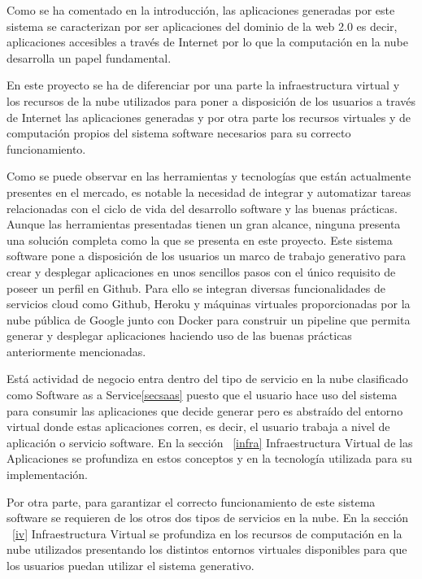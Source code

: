 \documentclass[a4paper,11pt]{book}
\begin{document}
Como se ha comentado en la introducción, las aplicaciones generadas por este sistema se caracterizan por ser aplicaciones del dominio de la web 2.0 es decir, aplicaciones accesibles a través de Internet por lo que la computación en la nube desarrolla un papel fundamental. 

En este proyecto se ha de diferenciar por una parte la infraestructura virtual y los recursos de la nube utilizados para poner a disposición de los usuarios  a través de Internet las aplicaciones generadas y por otra parte los recursos virtuales y de computación propios del sistema software necesarios para su correcto funcionamiento. 

Como se puede observar en las herramientas y tecnologías que están actualmente presentes en el mercado, es notable la necesidad de integrar y automatizar tareas relacionadas con el ciclo de vida del desarrollo software y las buenas prácticas. Aunque las herramientas presentadas tienen un gran alcance, ninguna presenta una solución completa como la que se presenta en este proyecto. Este sistema software pone a disposición de los usuarios un marco de trabajo generativo para crear y desplegar aplicaciones en unos sencillos pasos con el único requisito de poseer un perfil en Github. Para ello se integran diversas funcionalidades de servicios cloud como Github, Heroku y máquinas virtuales proporcionadas por la nube pública de Google  junto con Docker para construir un pipeline que permita generar y desplegar aplicaciones haciendo uso de las buenas prácticas anteriormente mencionadas.

Está actividad de negocio entra dentro del tipo de servicio en la nube clasificado como Software as a Service\ref{secsaas} puesto que el usuario hace uso del sistema para consumir las aplicaciones que decide generar pero es abstraído del entorno virtual donde estas aplicaciones corren, es decir, el usuario trabaja a nivel de aplicación o servicio software. En la sección ~\ref{infra}  Infraestructura Virtual de las Aplicaciones se profundiza en estos conceptos y en la tecnología utilizada para su implementación. 

Por otra parte, para garantizar el correcto funcionamiento de este sistema software se requieren de los otros dos tipos de servicios en la nube. En la sección ~\ref{iv} Infraestructura Virtual se profundiza en los recursos de computación en la nube utilizados presentando los distintos entornos virtuales disponibles para que los usuarios puedan utilizar el sistema generativo.
\end{document}
